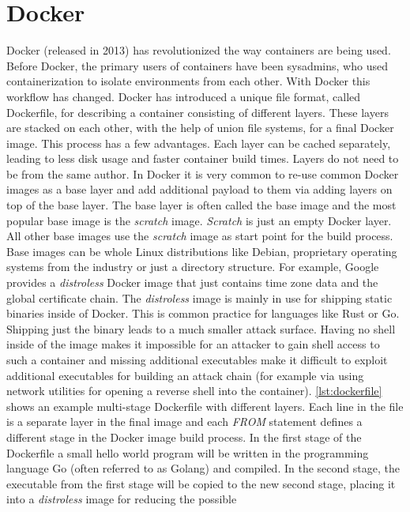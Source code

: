 \documentclass[titlepage]{report}
\begin{document}
\section{Docker}
Docker (released in 2013\cite{DockerRelease}) has revolutionized the way containers are being used.
Before Docker, the primary users of containers have been sysadmins, who used containerization to isolate environments from each other. With Docker
this workflow has changed. Docker has introduced a unique file format, called Dockerfile, for describing a container consisting of different layers. These layers
are stacked on each other, with the help of union file systems, for a final Docker image. This process has a few advantages. Each layer can be cached separately, leading
to less disk usage and faster container build times. Layers do not need to be from the same author. In Docker it is very common to re-use common Docker images
as a base layer and add additional payload to them via adding layers on top of the base layer. The base layer is often called the base image and the most popular
base image is the \emph{scratch} image. \emph{Scratch} is just an empty Docker layer. All other base images use the \emph{scratch} image as start point for the build process.
Base images can be whole Linux distributions like Debian, proprietary operating systems from the industry or just a directory structure. For example, Google provides
a \emph{distroless} Docker image that just contains time zone data and the global certificate chain\cite{Distroless}. The \emph{distroless} image is mainly in use for shipping
static binaries inside of Docker. This is common practice for languages like Rust or Go. Shipping just the binary leads to a much smaller attack surface. Having no shell inside
of the image makes it impossible for an attacker to gain shell access to such a container and missing additional executables make it difficult to
exploit additional executables for building an attack chain (for example via using network utilities for opening a reverse shell into the container).
\autoref{lst:dockerfile} shows an example multi-stage Dockerfile with different layers. Each line in the file is a separate layer in the final image
and each \emph{FROM} statement defines a different stage in the Docker image build process. In the first stage of the Dockerfile
a small hello world program will be written in the programming language Go (often referred to as Golang) and compiled. In the second stage,
the executable from the first stage will be copied to the new second stage, placing it into a \emph{distroless} image for reducing the possible
\end{document}
